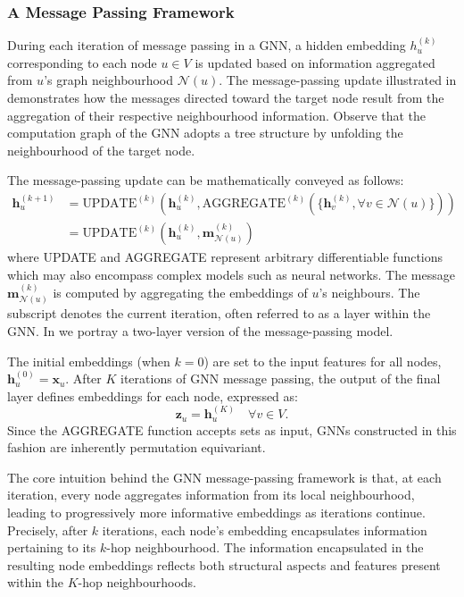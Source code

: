 \subsubsection{A Message Passing Framework}
During each iteration of message passing in a GNN, a hidden embedding $ h_u^{(k)} $ corresponding to each node $ u \in V $ is updated based on information aggregated from $ u $’s graph neighbourhood $ \mathcal{N}(u) $. The message-passing update illustrated in  demonstrates how the messages directed toward the target node result from the aggregation of their respective neighbourhood information. Observe that the computation graph of the GNN adopts a tree structure by unfolding the neighbourhood of the target node.



The message-passing update can be mathematically conveyed as follows:
\begin{align}\label{eq:GNNupdate}
    \mathbf{h}_u^{(k+1)} &= \text{UPDATE}^{(k)}\left(\mathbf{h}_u^{(k)}, \text{AGGREGATE}^{(k)}(\{\mathbf{h}_v^{(k)}, \forall v \in \mathcal{N}(u)\})\right) \\
    &= \text{UPDATE}^{(k)}\left(\mathbf{h}_u^{(k)}, \mathbf{m}_{\mathcal{N}(u)}^{(k)}\right)
\end{align}
where UPDATE and AGGREGATE represent arbitrary differentiable functions which may also encompass complex models such as neural networks. The message $ \mathbf{m}_{\mathcal{N}(u)}^{(k)} $ is computed by aggregating the embeddings of $ u $'s neighbours. The subscript denotes the current iteration, often referred to as a layer within the GNN. In  we portray a two-layer version of the message-passing model.

The initial embeddings (when $ k=0 $) are set to the input features for all nodes, $ \mathbf{h}_u^{(0)} = \mathbf{x}_u $. After $ K $ iterations of GNN message passing, the output of the final layer defines embeddings for each node, expressed as:
\begin{equation*}
    \mathbf{z}_u=\mathbf{h}_u^{(K)} \quad \forall v \in V.
\end{equation*}
Since the AGGREGATE function accepts sets as input, GNNs constructed in this fashion are inherently permutation equivariant.

The core intuition behind the GNN message-passing framework is that, at each iteration, every node aggregates information from its local neighbourhood, leading to progressively more informative embeddings as iterations continue. Precisely, after $ k $ iterations, each node's embedding encapsulates information pertaining to its $ k $-hop neighbourhood. The information encapsulated in the resulting node embeddings reflects both structural aspects and features present within the $ K $-hop neighbourhoods.

